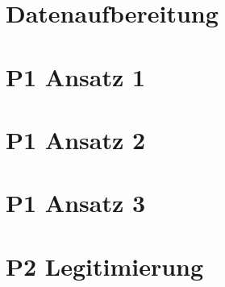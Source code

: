 \section{Datenaufbereitung}

\section{P1 Ansatz 1}

\section{P1 Ansatz 2}

\section{P1 Ansatz 3}

\section{P2 Legitimierung}
